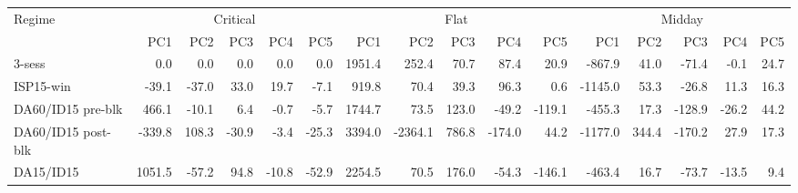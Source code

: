 \begin{tabular}{l r r r r r r r r r r r r r r r}
\toprule
Regime & \multicolumn{5}{c}{Critical} & \multicolumn{5}{c}{Flat} & \multicolumn{5}{c}{Midday} \\
\cmidrule(lr){2-6}\cmidrule(lr){7-11}\cmidrule(lr){12-16}
 & PC1 & PC2 & PC3 & PC4 & PC5 & PC1 & PC2 & PC3 & PC4 & PC5 & PC1 & PC2 & PC3 & PC4 & PC5 \\
\midrule
3-sess & 0.0 & 0.0 & 0.0 & 0.0 & 0.0 & 1951.4 & 252.4 & 70.7 & 87.4 & 20.9 & -867.9 & 41.0 & -71.4 & -0.1 & 24.7 \\
ISP15-win & -39.1 & -37.0 & 33.0 & 19.7 & -7.1 & 919.8 & 70.4 & 39.3 & 96.3 & 0.6 & -1145.0 & 53.3 & -26.8 & 11.3 & 16.3 \\
DA60/ID15 pre-blk & 466.1 & -10.1 & 6.4 & -0.7 & -5.7 & 1744.7 & 73.5 & 123.0 & -49.2 & -119.1 & -455.3 & 17.3 & -128.9 & -26.2 & 44.2 \\
DA60/ID15 post-blk & -339.8 & 108.3 & -30.9 & -3.4 & -25.3 & 3394.0 & -2364.1 & 786.8 & -174.0 & 44.2 & -1177.0 & 344.4 & -170.2 & 27.9 & 17.3 \\
DA15/ID15 & 1051.5 & -57.2 & 94.8 & -10.8 & -52.9 & 2254.5 & 70.5 & 176.0 & -54.3 & -146.1 & -463.4 & 16.7 & -73.7 & -13.5 & 9.4 \\
\bottomrule
\end{tabular}